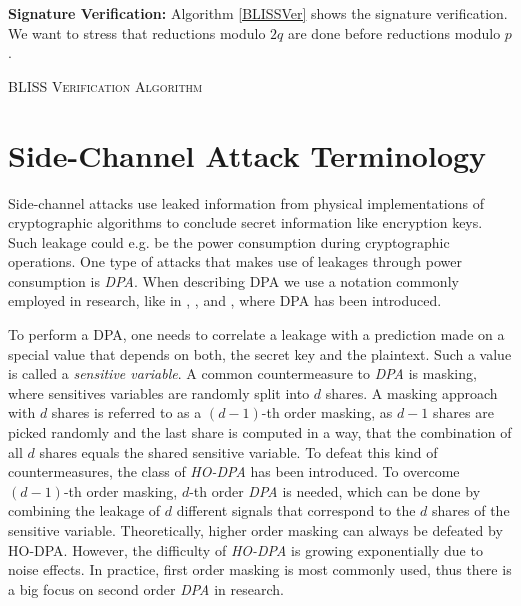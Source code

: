 \textbf{Signature Verification:} Algorithm \ref{BLISSVer} shows the signature verification. We want to stress that reductions modulo \(2q\) are done before reductions modulo \(p\).
\begin{algorithm}
    \label{BLISSVer}
    \caption{\textsc{BLISS Verification Algorithm}}
    \begin{algorithmic}[1]
    	\EndIf
    	\EndIf
    \end{algorithmic}
\end{algorithm}

\section{Side-Channel Attack Terminology}
Side-channel attacks use leaked information from physical implementations of cryptographic algorithms to conclude secret information like encryption keys. Such leakage could e.g. be the power consumption during cryptographic operations. One type of attacks that makes use of leakages through power consumption is \textit{\ac{DPA}}. When describing \ac{DPA} we use a notation commonly employed in research, like in \cite{cryptoeprint:2010:646}, \cite{cryptoeprint:2010:385}, \cite{DBLP:conf/crypto/KocherJJ99} and \cite{Kocher2011}, where \acl{DPA} has been introduced.

To perform a DPA, one needs to correlate a leakage with a prediction made on a special value that depends on both, the secret key and the plaintext. Such a value is called a \textit{sensitive variable}. A common countermeasure to \textit{\ac{DPA}} is masking, where sensitives variables are randomly split into \(d\) shares. A masking approach with \(d\) shares is referred to as a \((d-1)\)-th order masking, as \(d-1\) shares are picked randomly and the last share is computed in a way, that the combination of all \(d\) shares equals the shared sensitive variable. To defeat this kind of countermeasures, the class of \textit{\ac{HO-DPA}} has been introduced. To overcome \((d-1)\)-th order masking, \(d\)-th order \textit{\ac{DPA}} is needed, which can be done by combining the leakage of \(d\) different signals that correspond to the \(d\) shares of the sensitive variable. Theoretically, higher order masking can always be defeated by HO-DPA. However, the difficulty of \textit{\ac{HO-DPA}} is growing exponentially due to noise effects. In practice, first order masking is most commonly used, thus there is a big focus on second order \textit{\ac{DPA}} in research.